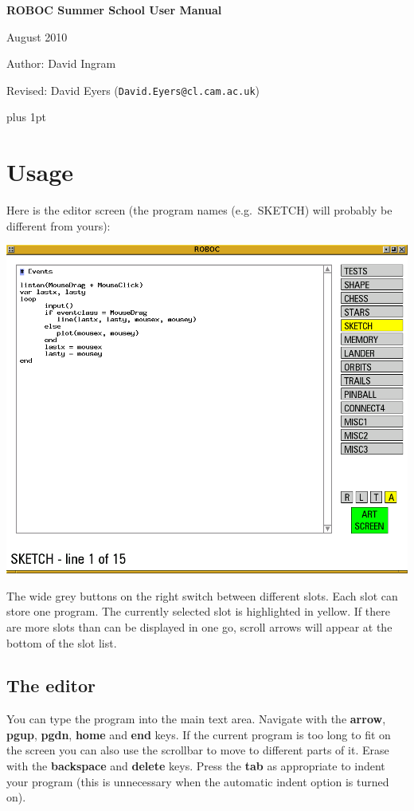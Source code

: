 \documentclass[12pt,a4paper,twoside]{article}
\renewcommand{\_}{\texttt{\symbol{95}}}
\begin{document}
\centerline{\textbf{\LARGE ROBOC Summer School User Manual}}
\vspace{0.5cm}
\centerline{August 2010}
\centerline{Author: David Ingram}
\centerline{Revised: David Eyers (\texttt{David.Eyers@cl.cam.ac.uk})}

{ \parskip 1mm plus 1pt \tableofcontents }

\newpage
\section{Usage}

Here is the editor screen (the program names (e.g.\ SKETCH) will probably be different
from yours):

\begin{center}
\includegraphics[scale=0.6,angle=0]{screenshots/ide/editor}
\end{center}

The wide grey buttons on the right switch between different slots. Each
slot can store one program. The currently selected slot is highlighted
in yellow. If there are more slots than can be
displayed in one go, scroll arrows will appear at the bottom of the
slot list.

\subsection{The editor}

You can type the program into
the main text area. Navigate with the \textbf{arrow}, \textbf{pgup},
\textbf{pgdn}, \textbf{home} and \textbf{end} keys. If the
current program is too long to fit on the screen you can also use the
scrollbar to move to different parts of it.
Erase with the \textbf{backspace} and \textbf{delete} keys.
Press the \textbf{tab} as appropriate
to indent your program (this is unnecessary when the automatic indent
option is
turned on).
\end{document}
